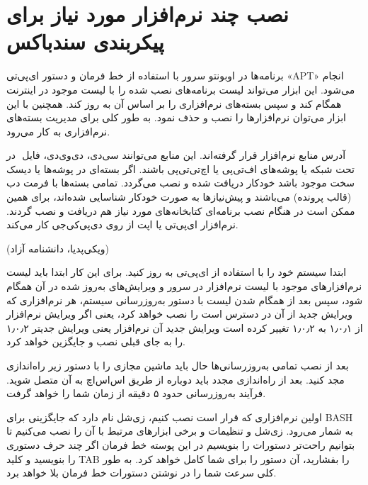 \section{نصب چند نرم‌افزار مورد نیاز برای پیکربندی سندباکس}
برنامه‌ها در اوبونتو سرور با استفاده از خط فرمان و دستور ای‌پی‌تی «APT» انجام می‌شود. این ابزار می‌تواند لیست برنامه‌های نصب شده را با لیست موجود در اینترنت همگام کند و سپس بسته‌های نرم‌افزاری را بر اساس آن به روز کند. همچنین با این ابزار می‌توان نرم‌افزارها را نصب و حذف نمود. به طور کلی برای مدیریت بسته‌های نرم‌افزاری به کار می‌رود.

در ‎
آدرس منابع نرم‌افزار قرار گرفته‌اند. این منابع می‌توانند سی‌دی، دی‌وی‌دی، فایل تحت شبکه یا پوشه‌های اف‌تی‌پی یا اچ‌تی‌تی‌پی باشند. اگر بسته‌ای در پوشه‌ها یا دیسک سخت موجود باشد خودکار دریافت شده و نصب می‌گردد. تمامی بسته‌ها با فرمت دب (قالب پرونده) می‌باشند و پیش‌نیازها به صورت خودکار شناسایی شده‌اند، برای همین ممکن است در هنگام نصب برنامه‌ای کتابخانه‌های مورد نیاز هم دریافت و نصب گردند. نرم‌افزار ای‌پی‌تی یا اپت از روی دی‌پی‌کی‌جی کار می‌کند. 
\begin{flushleft}
    (ویکی‌پدیا، دانشنامه آزاد)
\end{flushleft}

ابتدا سیستم خود را با استفاده از ای‌پی‌تی به روز کنید. برای این کار ابتدا باید لیست نرم‌افزارهای موجود با لیست نرم‌افزار در سرور و ویرایش‌های به‌روز شده در آن همگام شود، سپس بعد از همگام شدن لیست با دستور به‌روزرسانی سیستم، هر نرم‌افزاری که ویرایش جدید از آن در دسترس است را نصب خواهد کرد، یعنی اگر ویرایش نرم‌افزار از ۱٫۰٫۱ به ۱٫۰٫۲ تغییر کرده است ویرایش جدید آن نرم‌افزار یعنی ویرایش جدیتر ۱٫۰٫۲ را به جای قبلی نصب و جایگزین خواهد کرد.
\begin{latin}
    
\end{latin}
بعد از نصب تمامی به‌روزرسانی‌ها حال باید ماشین مجازی را با دستور زیر راه‌اندازی مجد کنید. بعد از راه‌اندازی مجدد باید دوباره از طریق اس‌اس‌اچ به آن متصل شوید. فرآیند به‌روزرسانی حدود ۵ دقیقه از زمان شما را خواهد گرفت.
\begin{latin}
    
\end{latin}
اولین نرم‌افزاری که قرار است نصب کنیم، زی‌شل نام دارد که جایگزینی برای BASH به شمار می‌رود.  زی‌شل و تنظیمات و برخی ابزارهای مرتبط با آن را نصب می‌کنیم تا بتوانیم راحت‌تر دستورات را بنویسیم در این پوسته خط فرمان اگر چند حرف دستوری را بنویسید و کلید TAB را بفشارید، آن دستور را برای شما کامل خواهد کرد. به طور کلی سرعت شما را در نوشتن دستورات خط فرمان بلا خواهد برد.

